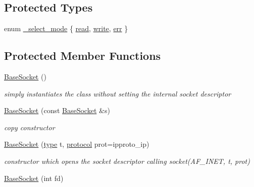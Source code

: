 \subsection*{Protected Types}
\begin{CompactItemize}
\item 
enum \hyperlink{classsocketpp_1_1BaseSocket_21492d478c5aa2ff8a1ad258ccf58062}{\_\-select\_\-mode} \{ \hyperlink{classsocketpp_1_1BaseSocket_21492d478c5aa2ff8a1ad258ccf580624782d25091b1ee2cda4f94b131593ce6}{read}, 
\hyperlink{classsocketpp_1_1BaseSocket_21492d478c5aa2ff8a1ad258ccf58062a19a7e61ac1d2a5dcb0efb4f71795685}{write}, 
\hyperlink{classsocketpp_1_1BaseSocket_21492d478c5aa2ff8a1ad258ccf58062401c7b14b3583749a9a5234ff43cb1c4}{err}
 \}
\subsection*{Protected Member Functions}
\begin{CompactItemize}
\item 
\hyperlink{classsocketpp_1_1BaseSocket_3eb81ecbf94ce83afa6b2f60206c77f2}{BaseSocket} ()
\begin{CompactList}\small\item\em simply instantiates the class without setting the internal socket descriptor \item\end{CompactList}\item 
\hyperlink{classsocketpp_1_1BaseSocket_0c142db99422572579c91f3e176035c6}{BaseSocket} (const \hyperlink{classsocketpp_1_1BaseSocket}{BaseSocket} \&s)
\begin{CompactList}\small\item\em copy constructor \item\end{CompactList}\item 
\hyperlink{classsocketpp_1_1BaseSocket_35c982d7aef2041c100439cf38aa7f4d}{BaseSocket} (\hyperlink{namespacesocketpp_635f4c3b3f85aba331587404d59ae52d}{type} t, \hyperlink{namespacesocketpp_2969678def1c6c8cb4102802ca82e2cf}{protocol} prot=ipproto\_\-ip)
\begin{CompactList}\small\item\em constructor which opens the socket descriptor calling socket(AF\_\-INET, t, prot) \item\end{CompactList}\item 
\hyperlink{classsocketpp_1_1BaseSocket_f7e18d6700868abb2b476e797506eafb}{BaseSocket} (int fd)

\end{CompactItemize}
\end{CompactItemize}

